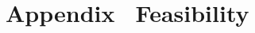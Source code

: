 \section*{Appendix \thesection \, \textbar \vspace{0.5em} Feasibility}
\label{sec:appendix-feasibility}
%